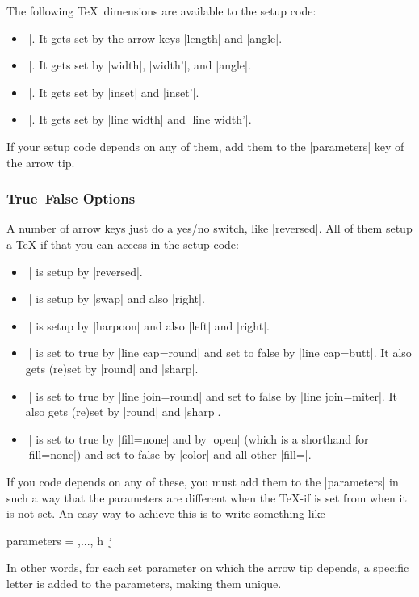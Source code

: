 The following \TeX\ dimensions are available to the setup code:
%
\begin{itemize}
    \item |\pgfarrowslength|. It gets set by the arrow keys |length| and
        |angle|.
    \item |\pgfarrowswidth|. It gets set by |width|, |width'|, and |angle|.
    \item |\pgfarrowsinset|. It gets set by |inset| and |inset'|.
    \item |\pgfarrowslinewidth|. It gets set by |line width| and |line width'|.
\end{itemize}

If your setup code depends on any of them, add them to the |parameters| key of
the arrow tip.


\subsubsection{True--False Options}

A number of arrow keys just do a yes/no switch, like |reversed|. All of them
setup a \TeX-if that you can access in the setup code:
%
\begin{itemize}
    \item |\ifpgfarrowreversed| is setup by |reversed|.
    \item |\ifpgfarrowswap| is setup by |swap| and also |right|.
    \item |\ifpgfarrowharpoon| is setup by |harpoon| and also |left| and
        |right|.
    \item |\ifpgfarrowroundcap| is set to true by |line cap=round| and set to
        false by |line cap=butt|. It also gets (re)set by  |round| and |sharp|.
    \item |\ifpgfarrowroundjoin| is set to true by |line join=round| and set to
        false by |line join=miter|. It also gets (re)set by  |round| and
        |sharp|.
    \item |\ifpgfarrowopen| is set to true by |fill=none| and by |open| (which
        is a shorthand for |fill=none|) and set to false by |color| and all
        other |fill=|.
\end{itemize}

If you code depends on any of these, you must add them to the |parameters| in
such a way that the parameters are different when the \TeX-if is set from when
it is not set. An easy way to achieve this is to write something like
%
\begin{codeexample}
  parameters = { \the\pgfarrowlength,...,
                 \ifpgfarrowharpoon h\fi\
                 \ifpgfarrowroundjoin j\fi}
\end{codeexample}
%
In other words, for each set parameter on which the arrow tip depends, a
specific letter is added to the parameters, making them unique.


